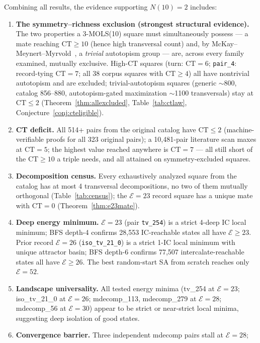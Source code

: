 \documentclass[11pt,a4paper]{article}
\theoremstyle{remark}
\newcommand{\CT}{\mathrm{CT}}
\newcommand{\E}{\mathcal{E}}
\begin{document}
Combining all results, the evidence supporting $N(10)=2$ includes:
\begin{enumerate}
  \item \textbf{The symmetry--richness exclusion (strongest structural evidence).}
    The two properties a 3-MOLS(10) square must simultaneously possess ---
    a mate reaching $\CT\geq10$ (hence high transversal count) and, by
    McKay--Meynert--Myrvold~\cite{mmm2007}, a \emph{trivial} autotopism
    group --- are, across every family examined, mutually exclusive.
    High-$\CT$ squares (turn: $\CT=6$; \texttt{pair\_4}: record-tying
    $\CT=7$; all 38 corpus squares with $\CT\geq4$) all have nontrivial
    autotopism and are excluded; trivial-autotopism squares (generic
    $\sim$800, catalog 856--880, autotopism-gated maximization $\sim$1100
    transversals) stay at $\CT\leq2$ (Theorem~\ref{thm:allexcluded},
    Table~\ref{tab:ctlaw}, Conjecture~\ref{conj:cteligible}).
  \item \textbf{CT deficit.} All 514+ pairs from the original catalog have
    $\CT \leq 2$ (machine-verifiable proofs for all 323 original pairs); a
    10{,}481-pair literature scan maxes at $\CT=5$; the highest value reached
    anywhere is $\CT=7$ --- all still short of the $\CT\geq10$ a triple needs,
    and all attained on symmetry-excluded squares.
  \item \textbf{Decomposition census.} Every exhaustively analyzed square from the
    catalog has at most 4 transversal decompositions, no two of them mutually
    orthogonal (Table~\ref{tab:census}); the $\E=23$ record square has a unique
    mate with $\CT = 0$ (Theorem~\ref{thm:e23mate}).
  \item \textbf{Deep energy minimum.} $\E=23$ (pair \texttt{tv\_254}) is a strict 4-deep
    IC local minimum; BFS depth-4 confirms 28,553 IC-reachable states all have $\E \geq 23$.
    Prior record $\E=26$ (\texttt{iso\_tv\_21\_0}) is a strict 1-IC local minimum with unique
    attractor basin; BFS depth-6 confirms 77,507 intercalate-reachable states all have $\E \geq 26$.
    The best random-start SA from scratch reaches only $\E=52$.
  \item \textbf{Landscape universality.} All tested energy minima (tv\_254 at $\E=23$;
    iso\_tv\_21\_0 at $\E=26$; mdecomp\_113, mdecomp\_279 at $\E=28$; mdecomp\_56 at $\E=30$)
    appear to be strict or near-strict local minima, suggesting deep isolation of good states.
  \item \textbf{Convergence barrier.} Three independent mdecomp pairs stall at $\E=28$;

\end{enumerate}
\end{document}
